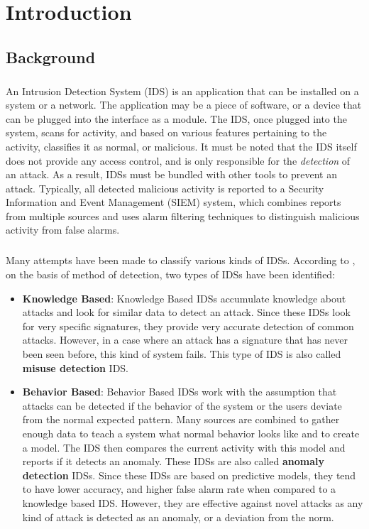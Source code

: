 
\chapter{Introduction}
\label{ch:INTR}
\section{Background}

\paragraph{}
An Intrusion Detection System (IDS) is an application that can be installed on a system or a network. The application may be a piece of software, or a device that can be plugged into the interface as a module. The IDS, once plugged into the system, scans for activity, and based on various features pertaining to the activity, classifies it as normal, or malicious. It must be noted that the IDS itself does not provide any access control, and is only responsible for the \textit{detection} of an attack. As a result, IDSs must be bundled with other tools to prevent an attack. Typically, all detected malicious activity is reported to a Security Information and Event Management (SIEM) system, which combines reports from multiple sources and uses alarm filtering techniques to distinguish malicious activity from false alarms.

\paragraph{}
Many attempts have been made to classify various kinds of IDSs. According to \cite{ids_taxonomy}, on the basis of method of detection, two types of IDSs have been identified:
\begin{itemize}
    \item \textbf{Knowledge Based}: Knowledge Based IDSs accumulate knowledge about attacks and look for similar data to detect an attack. Since these IDSs look for very specific signatures, they provide very accurate detection of common attacks. However, in a case where an attack has a signature that has never been seen before, this kind of system fails. This type of IDS is also called \textbf{misuse detection} IDS.

    \item \textbf{Behavior Based}: Behavior Based IDSs work with the assumption that attacks can be detected if the behavior of the system or the users deviate from the normal expected pattern. Many sources are combined to gather enough data to teach a system what normal behavior looks like and to create a model. The IDS then compares the current activity with this model and reports if it detects an anomaly. These IDSs are also called \textbf{anomaly detection} IDSs. Since these IDSs are based on predictive models, they tend to have lower accuracy, and higher false alarm rate when compared to a knowledge based IDS. However, they are effective against novel attacks as any kind of attack is detected as an anomaly, or a deviation from the norm.
\end{itemize}

